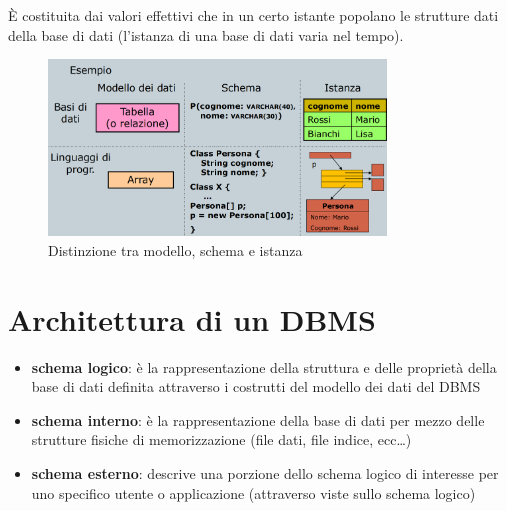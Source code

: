 \documentclass[a4paper, 12pt]{book}
\begin{document}

    \vspace{15pt}

    \begin{tcolorbox}[
      colback=cyan!5!white,
      colframe=blue!50!black,
      title=\textbf{Definizione - Istanza di una base di dati},
      coltitle=white,
      fonttitle=\bfseries,
      arc=3mm,
      boxrule=0.5pt,
      enhanced,
      breakable
    ]
    È costituita dai valori effettivi che in un certo istante popolano le strutture dati della base di dati (l’istanza di una base di dati varia nel tempo).

    \end{tcolorbox}

    \vspace{15pt}



    \begin{figure}[h]
        \centering
        \includegraphics[width=0.8\textwidth]{images/modelloSchemaIstanza.png}
        \caption{Distinzione tra modello, schema e istanza}
    \end{figure}



    \section*{Architettura di un DBMS}

    \begin{itemize}
      \item \textbf{schema logico}: è la rappresentazione della struttura e delle proprietà della base di dati definita attraverso i costrutti del modello dei dati del DBMS
      \item \textbf{schema interno}: è la rappresentazione della base di dati per mezzo delle strutture fisiche di memorizzazione (file dati, file indice, ecc…)
      \item \textbf{schema esterno}: descrive una porzione dello schema logico di interesse per uno specifico utente o applicazione (attraverso viste sullo schema logico)
    \end{itemize}
  
\end{document}
